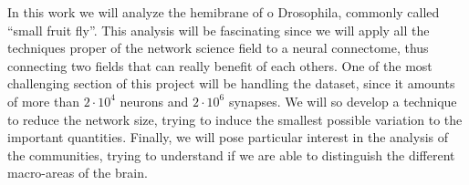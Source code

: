 In this work we will analyze the hemibrane of o Drosophila, commonly called “small fruit fly”.
This analysis will be fascinating since we will apply all the techniques proper of the 
network science field to a neural connectome, thus connecting two fields that can really 
benefit of each others. One of the most challenging section of this project will be handling
the dataset, since it amounts of more than $2\cdot10^{4}$ neurons and $2\cdot10^6$ synapses.
We will so develop a technique to reduce the network size, trying to induce the smallest
possible variation to the important quantities. Finally, we will pose particular interest
in the analysis of the communities, trying to understand if we are able to distinguish
the different macro-areas of the brain.